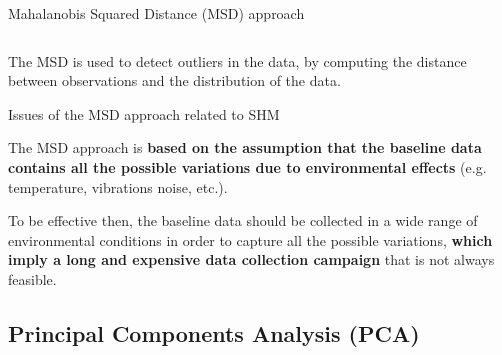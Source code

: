 \begin{frame}{Mahalanobis Squared Distance (MSD) approach}
\begin{columns}[c, onlytextwidth]
\begin{column}{0.45\textwidth}
        \end{column}

    \end{columns}

    \vspace{9pt}

    The MSD is used to detect outliers in the data, by computing the distance between observations and the distribution of the data.

\end{frame}



\begin{frame}{Issues of the MSD approach related to SHM}

    The MSD approach is \textbf{based on the assumption that the baseline data contains all the possible variations due to environmental effects} (e.g. temperature, vibrations noise, etc.).

    \vspace{9pt}

    To be effective then, the baseline data should be collected in a wide range of environmental conditions in order to capture all the possible variations, \textbf{which imply a long and expensive data collection campaign} that is not always feasible.

\end{frame}



\subsection{Principal Components Analysis (PCA)}

